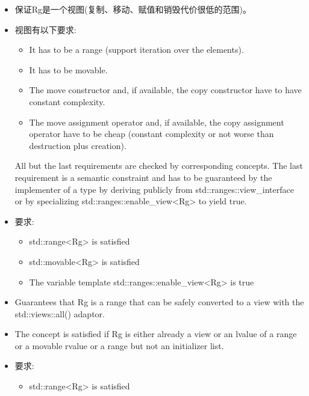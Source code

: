 \begin{itemize}
\item
保证Rg是一个视图(复制、移动、赋值和销毁代价很低的范围)。

\item
视图有以下要求:

\begin{itemize}
\item
It has to be a range (support iteration over the elements).

\item
It has to be movable.

\item
The move constructor and, if available, the copy constructor have to have constant complexity.

\item
The move assignment operator and, if available, the copy assignment operator have to be cheap (constant complexity or not worse than destruction plus creation).
\end{itemize}

All but the last requirements are checked by corresponding concepts. The last requirement is a semantic constraint and has to be guaranteed by the implementer of a type by deriving publicly from std::ranges::view\_interface or by specializing std::ranges::enable\_view<Rg> to yield true.

\item
要求:

\begin{itemize}
\item
std::range<Rg> is satisfied

\item
std::movable<Rg> is satisfied

\item
The variable template std::ranges::enable\_view<Rg> is true
\end{itemize}
\end{itemize}


\begin{itemize}
\item
Guarantees that Rg is a range that can be safely converted to a view with the std::views::all() adaptor.

\item
The concept is satisfied if Rg is either already a view or an lvalue of a range or a movable rvalue or a range but not an initializer list.

\item
要求:

\begin{itemize}
\item
std::range<Rg> is satisfied

\end{itemize}
\end{itemize}


